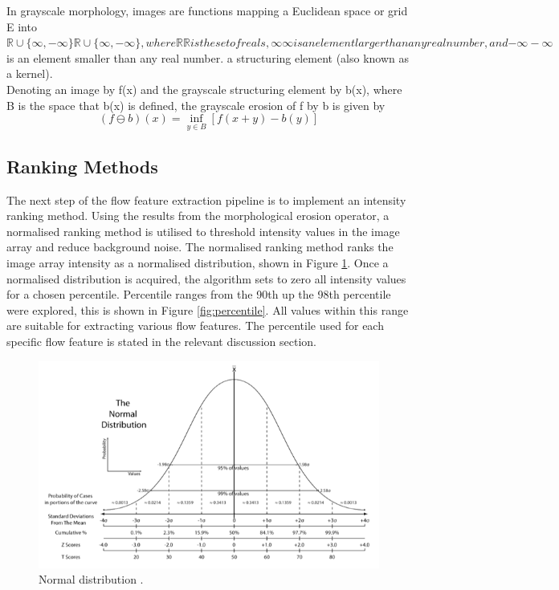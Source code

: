 In grayscale morphology, images are functions mapping a Euclidean space or grid E into ${\displaystyle \mathbb {R} \cup \{\infty ,-\infty \}} {\mathbb  {R}}\cup \{\infty ,-\infty \}, where {\displaystyle \mathbb {R} } \mathbb {R}  is the set of reals, {\displaystyle \infty } \infty  is an element larger than any real number, and {\displaystyle -\infty } -\infty $ is an element smaller than any real number.
a structuring element (also known as a kernel).\\

Denoting an image by f(x) and the grayscale structuring element by b(x), where B is the space that b(x) is defined, the grayscale erosion of f by b is given by
\begin{equation}
(f\ominus b)(x)=\inf _{y\in B}[f(x+y)-b(y)]
\end{equation}



\subsection{Ranking Methods}
The next step of the flow feature extraction pipeline is to implement an intensity ranking method. Using the results from the morphological erosion operator, a normalised ranking method is utilised to threshold intensity values in the image array and reduce background noise. The normalised ranking method ranks the image array intensity as a normalised distribution, shown in Figure \ref{fig:dist}. Once a normalised distribution is acquired, the algorithm sets to zero all intensity values for a chosen percentile. Percentile ranges from the 90th up the 98th percentile were explored, this is shown in Figure \ref{fig:percentile}. All values within this range are suitable for extracting various flow features. The percentile used for each specific flow feature is stated in the relevant discussion section.

\begin{figure}[H] 
	\centering
	\includegraphics[width=1\textwidth]{dist.png} 
	\caption{Normal distribution \citep{brownlee1965statistical}.}
	\label{fig:dist}
\end{figure}


